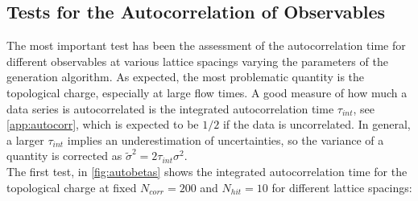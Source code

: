 \subsection{Tests for the Autocorrelation of Observables}
\label{sec:obs_autocorr}
The most important test has been the assessment of the autocorrelation time for different observables at various lattice spacings varying the parameters of the generation algorithm. As expected, the most problematic quantity is the topological charge, especially at large flow times. A good measure of how much a data series is autocorrelated is the integrated autocorrelation time $\tau_{int}$, see \cref{app:autocorr}, which is expected to be $1/2$ if the data is uncorrelated. In general, a larger $\tau_{int}$ implies an underestimation of uncertainties, so the variance of a quantity is corrected as $\tilde\sigma^2 = 2\tau_{int}\sigma^2$. \\
The first test, in \cref{fig:autobetas} shows the integrated autocorrelation time for the topological charge at fixed $N_{corr}=200$ and $N_{hit} = 10$ for different lattice spacings:

